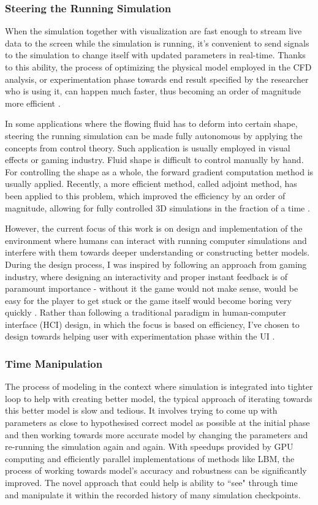 \subsubsection{Steering the Running Simulation}
When the simulation together with visualization are fast enough to stream live data to the screen while the simulation is running, it's convenient to send signals to the simulation to change itself with updated parameters in real-time. Thanks to this ability, the process of optimizing the physical model employed in the CFD analysis, or experimentation phase towards end result specified by the researcher who is using it, can happen much faster, thus becoming an order of magnitude more efficient \citep{kreylos2002}. 

In some applications where the flowing fluid has to deform into certain shape, steering the running simulation can be made fully autonomous by applying the concepts from control theory. Such application is usually employed in visual effects or gaming industry. Fluid shape is difficult to control manually by hand. For controlling the shape as a whole, the forward gradient computation method is usually applied. Recently, a more efficient method, called adjoint method, has been applied to this problem, which improved the efficiency by an order of magnitude, allowing for fully controlled 3D simulations in the fraction of a time \citep{mcnamaraFluidControl2004}.

However, the current focus of this work is on design and implementation of the environment where humans can interact with running computer simulations and interfere with them towards deeper understanding or constructing better models. During the design process, I was inspired by following an approach from gaming industry, where designing an interactivity and proper instant feedback is of paramount importance - without it the game would not make sense, would be easy for the player to get stuck or the game itself would become boring very quickly \citep{victorMagicInk2006}. Rather than following a traditional paradigm in human-computer interface (HCI) design, in which the focus is based on efficiency, I've chosen to design towards helping user with experimentation phase within the UI \citep{spadaforaDesigningBehaviorInteractive2016}. 

\subsubsection{Time Manipulation}
The process of modeling in the context where simulation is integrated into tighter loop to help with creating better model, the typical approach of iterating towards this better model is slow and tedious. It involves trying to come up with parameters as close to hypothesised correct model as possible at the initial phase and then working towards more accurate model by changing the parameters and re-running the simulation again and again. With speedups provided by GPU computing and efficiently parallel implementations of methods like LBM, the process of working towards model's accuracy and robustness can be significantly improved. The novel approach that could help is ability to ``see" through time and manipulate it within the recorded history of many simulation checkpoints.

